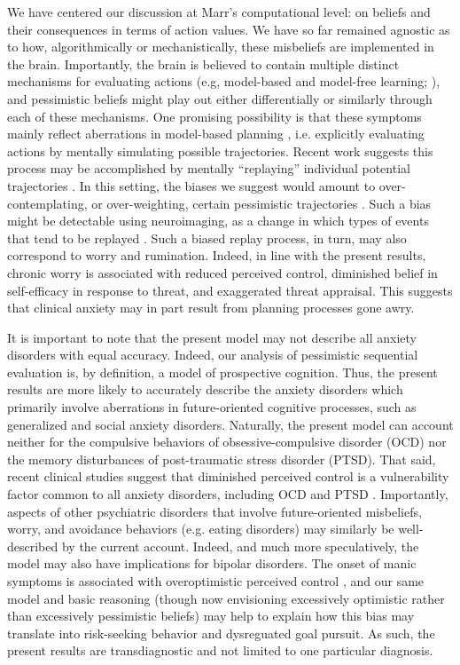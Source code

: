 \documentclass[11pt]{article} %
\begin{document}
We have centered our discussion at Marr's \cite{marr1982} computational level: on beliefs and their consequences in terms of action values. We have so far remained agnostic as to how, algorithmically or mechanistically, these misbeliefs are implemented in the brain. \cite{friston2014computational} Importantly, the brain is believed to contain multiple distinct mechanisms for evaluating actions (e.g, model-based and model-free learning; \cite{daw2005, huys2015}), and pessimistic beliefs might play out either differentially or similarly through each of these mechanisms. One promising possibility is that these symptoms mainly reflect aberrations in model-based planning \cite{huys2015}, i.e. explicitly evaluating actions by mentally simulating possible trajectories. Recent work suggests this process may be accomplished by mentally ``replaying'' individual potential trajectories \cite{momennejad_offline_2018,mattar2018}. In this setting, the biases we suggest would amount to over-contemplating, or over-weighting, certain pessimistic trajectories \cite{hunter2019}. Such a bias might be detectable using neuroimaging, as a change in which types of events that tend to be replayed \cite{momennejad_offline_2018, ambrose2016}. Such a biased replay process, in turn, may also correspond to worry and rumination. Indeed, in line with the present results, chronic worry is associated with reduced perceived control, diminished belief in self-efficacy in response to threat, and exaggerated threat appraisal\cite{Berenbaum2010}. This suggests that clinical anxiety may in part result from planning processes gone awry. 

It is important to note that the present model may not describe all anxiety disorders with equal accuracy. Indeed, our analysis of pessimistic sequential evaluation is, by definition, a model of prospective cognition. Thus, the present results are more likely to accurately describe the anxiety disorders which primarily involve aberrations in future-oriented cognitive processes, such as generalized and social anxiety disorders. Naturally, the present model can account neither for the compulsive behaviors of obsessive-compulsive disorder (OCD) nor the memory disturbances of post-traumatic stress disorder (PTSD). That said, recent clinical studies suggest that diminished perceived control is a vulnerability factor common to all anxiety disorders, including OCD and PTSD \citep{gallagher2014a, gallagher2014b}. Importantly, aspects of other psychiatric disorders that involve future-oriented misbeliefs, worry, and avoidance behaviors (e.g. eating disorders\citep{konstantellou2011}) may similarly be well-described by the current account. Indeed, and much more speculatively, the model may also have implications for bipolar disorders. The onset of manic symptoms is associated with overoptimistic perceived control \cite{alloy2006}, and our same model and basic reasoning (though now envisioning excessively optimistic rather than excessively pessimistic beliefs) may help to explain how this bias may translate into risk-seeking behavior and dysreguated goal pursuit. As such, the present results are transdiagnostic and not limited to one particular diagnosis. 
\end{document}
